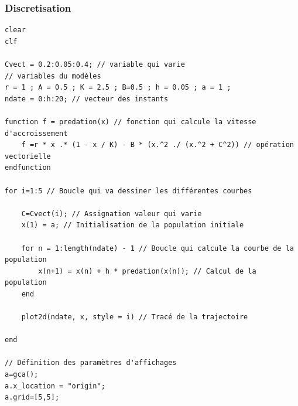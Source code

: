 \documentclass{article}
\begin{document}
\subsubsection{Discretisation}

\begin{verbatim}
clear
clf

Cvect = 0.2:0.05:0.4; // variable qui varie
// variables du modèles
r = 1 ; A = 0.5 ; K = 2.5 ; B=0.5 ; h = 0.05 ; a = 1 ;
ndate = 0:h:20; // vecteur des instants

function f = predation(x) // fonction qui calcule la vitesse d'accroissement
    f =r * x .* (1 - x / K) - B * (x.^2 ./ (x.^2 + C^2)) // opération vectorielle
endfunction

for i=1:5 // Boucle qui va dessiner les différentes courbes
    
    C=Cvect(i); // Assignation valeur qui varie
    x(1) = a; // Initialisation de la population initiale
    
    for n = 1:length(ndate) - 1 // Boucle qui calcule la courbe de la population
        x(n+1) = x(n) + h * predation(x(n)); // Calcul de la population
    end
    
    plot2d(ndate, x, style = i) // Tracé de la trajectoire

end

// Définition des paramètres d'affichages
a=gca();
a.x_location = "origin";
a.grid=[5,5];
\end{verbatim}
\end{document}
